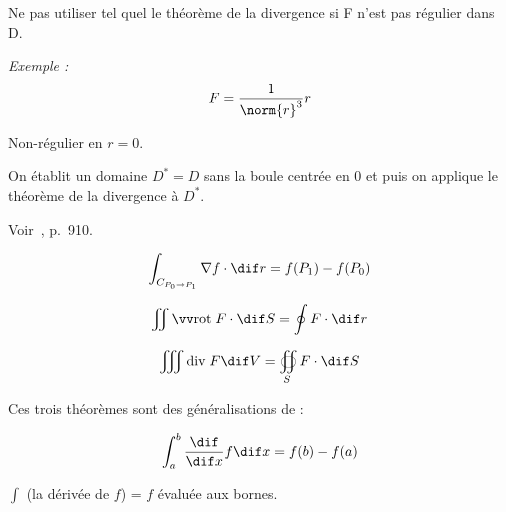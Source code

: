 \begin{myrem}
Ne pas utiliser tel quel le théorème de la divergence si F n'est pas régulier dans D.


\emph{Exemple :} \[F = \dfrac{1}{\norm{r}^3} r \]

Non-régulier en $r=0$.

On établit un domaine $ D^* =D $ sans la boule centrée en 0 et puis on applique le théorème de la divergence à $D^*$.

Voir~\cite{adams2013calculus}, p.~910.
\end{myrem}

\begin{myrem}
\[\int_{C_{P_0 \to P_1}} \nabla f \cdot \dif r = f(P_1) - f(P_0) \]

\[\iint \rot F \cdot \dif S = \oint F \cdot \dif r \]

\[\iiint \divt F \dif V = \oiint_S F \cdot \dif S\]

Ces trois théorèmes sont des généralisations de :

\[\int_a^b \frac{\dif}{\dif x}f \dif x = f(b) - f(a) \]

$\int$ (la dérivée de $f$) = $f$ évaluée aux bornes.
\end{myrem}
